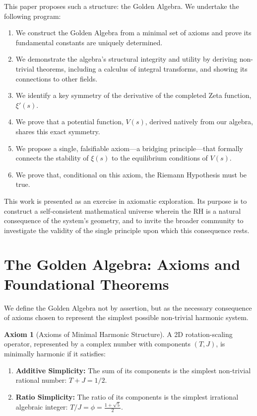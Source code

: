 \documentclass{article}
\theoremstyle{plain}
\theoremstyle{definition}
\newtheorem{axiom}{Axiom}
\theoremstyle{remark}
\begin{document}
This paper proposes such a structure: the Golden Algebra. We undertake the following program:
\begin{enumerate}
    \item We construct the Golden Algebra from a minimal set of axioms and prove its fundamental constants are uniquely determined.
    \item We demonstrate the algebra's structural integrity and utility by deriving non-trivial theorems, including a calculus of integral transforms, and showing its connections to other fields.
    \item We identify a key symmetry of the derivative of the completed Zeta function, $\xi'(s)$.
    \item We prove that a potential function, $V(s)$, derived natively from our algebra, shares this exact symmetry.
    \item We propose a single, falsifiable axiom—a bridging principle—that formally connects the stability of $\xi(s)$ to the equilibrium conditions of $V(s)$.
    \item We prove that, conditional on this axiom, the Riemann Hypothesis must be true.
\end{enumerate}
This work is presented as an exercise in axiomatic exploration. Its purpose is to construct a self-consistent mathematical universe wherein the RH is a natural consequence of the system's geometry, and to invite the broader community to investigate the validity of the single principle upon which this consequence rests.

\section{The Golden Algebra: Axioms and Foundational Theorems}
We define the Golden Algebra not by assertion, but as the necessary consequence of axioms chosen to represent the simplest possible non-trivial harmonic system.

\begin{axiom}[Axioms of Minimal Harmonic Structure]
A 2D rotation-scaling operator, represented by a complex number with components $(T,J)$, is minimally harmonic if it satisfies:
\begin{enumerate}
    \item \textbf{Additive Simplicity:} The sum of its components is the simplest non-trivial rational number: $T+J = 1/2$.
    \item \textbf{Ratio Simplicity:} The ratio of its components is the simplest irrational algebraic integer: $T/J = \phi = \frac{1+\sqrt{5}}{2}$.
\end{enumerate}
\end{axiom}
\end{document}
